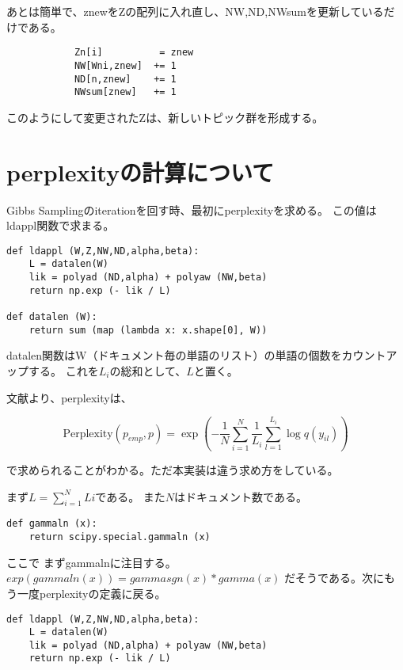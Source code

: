 \documentclass[uplatex]{jsarticle}
\begin{document}
あとは簡単で、znewをZの配列に入れ直し、NW,ND,NWsumを更新しているだけである。

\begin{lstlisting}
            Zn[i]          = znew
            NW[Wni,znew]  += 1
            ND[n,znew]    += 1
            NWsum[znew]   += 1
\end{lstlisting}

このようにして変更されたZは、新しいトピック群を形成する。

\section{perplexityの計算について}
Gibbs Samplingのiterationを回す時、最初にperplexityを求める。
この値はldappl関数で求まる。

\begin{lstlisting}
def ldappl (W,Z,NW,ND,alpha,beta):
    L = datalen(W)
    lik = polyad (ND,alpha) + polyaw (NW,beta)
    return np.exp (- lik / L)

def datalen (W):
    return sum (map (lambda x: x.shape[0], W))
\end{lstlisting}

datalen関数はW（ドキュメント毎の単語のリスト）の単語の個数をカウントアップする。
これを$L_i$の総和として、$L$と置く。

文献\cite{murphy}より、perplexityは、

\begin{equation}
\mbox{Perplexity}(p_{emp}, p) = \exp 
\left(-\frac{1}{N}\sum_{i=1}^{N}\frac{1}{L_i}\sum_{l=1}^{L_i} \log q(y_{il}) \right)
\end{equation}

で求められることがわかる。ただ本実装は違う求め方をしている。

まず$\displaystyle L = \sum_{i=1}^{N} Li$である。
また$N$はドキュメント数である。


\begin{lstlisting}
def gammaln (x):
    return scipy.special.gammaln (x)
\end{lstlisting}

ここで
まずgammalnに注目する。
$exp(gammaln(x)) = gammasgn(x)*gamma(x)$
だそうである。次にもう一度perplexityの定義に戻る。

\begin{lstlisting}
def ldappl (W,Z,NW,ND,alpha,beta):
    L = datalen(W)
    lik = polyad (ND,alpha) + polyaw (NW,beta)
    return np.exp (- lik / L)
\end{lstlisting}
\end{document}
